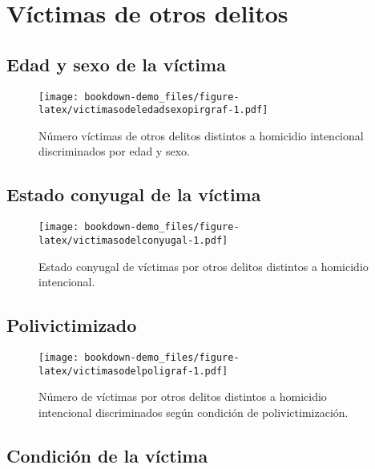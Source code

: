 \documentclass[
]{book}
\begin{document}
\hypertarget{vuxedctimas-de-otros-delitos}{%
\chapter{Víctimas de otros delitos}\label{vuxedctimas-de-otros-delitos}}

\hypertarget{edad-y-sexo-de-la-vuxedctima-2}{%
\section{Edad y sexo de la víctima}\label{edad-y-sexo-de-la-vuxedctima-2}}



\begin{figure}
\centering
\texttt{[image: bookdown-demo\_files/figure-latex/victimasodeledadsexopirgraf-1.pdf]}
\caption{\label{fig:victimasodeledadsexopirgraf}Número víctimas de otros delitos distintos a homicidio intencional discriminados por edad y sexo.}
\end{figure}

\hypertarget{estado-conyugal-de-la-vuxedctima-2}{%
\section{Estado conyugal de la víctima}\label{estado-conyugal-de-la-vuxedctima-2}}



\begin{figure}
\centering
\texttt{[image: bookdown-demo\_files/figure-latex/victimasodelconyugal-1.pdf]}
\caption{\label{fig:victimasodelconyugal}Estado conyugal de víctimas por otros delitos distintos a homicidio intencional.}
\end{figure}

\hypertarget{polivictimizado-1}{%
\section{Polivictimizado}\label{polivictimizado-1}}



\begin{figure}
\centering
\texttt{[image: bookdown-demo\_files/figure-latex/victimasodelpoligraf-1.pdf]}
\caption{\label{fig:victimasodelpoligraf}Número de víctimas por otros delitos distintos a homicidio intencional discriminados según condición de polivictimización.}
\end{figure}

\hypertarget{condiciuxf3n-de-la-vuxedctima-2}{%
\section{Condición de la víctima}\label{condiciuxf3n-de-la-vuxedctima-2}}
\end{document}
